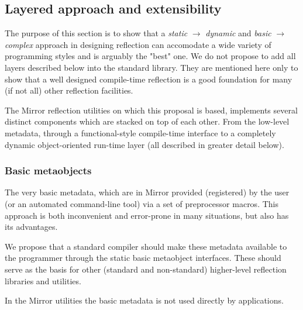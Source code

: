 \subsection{Layered approach and extensibility}

The purpose of this section is to show that a {\em static} $\to$ {\em dynamic}
and {\em basic} $\to$ {\em complex} approach in designing reflection
can accomodate a wide variety of programming styles and is arguably
the "best" one. We do not propose to add all layers described
below into the standard library. They are mentioned here only to
show that a well designed compile-time reflection is a good foundation
for many (if not all) other reflection facilities.

The Mirror reflection utilities \cite{mirror-doc-cpp11} on which this
proposal is based, implements several distinct components which
are stacked on top of each other. From the low-level metadata, through
a functional-style compile-time interface to a completely dynamic
object-oriented run-time layer (all described in greater detail below).

\subsubsection{Basic metaobjects}
The very basic metadata, which are in Mirror
provided (registered) by the user (or an automated command-line tool) via a set
of preprocessor macros. This approach is both inconvenient and error-prone
in many situations, but also has its advantages.

We propose that a standard compiler should make these metadata available
to the programmer through the static basic metaobject interfaces. These should
serve as the basis for other (standard and non-standard) higher-level
reflection libraries and utilities.

In the Mirror utilities the basic metadata is not used directly by
applications.





